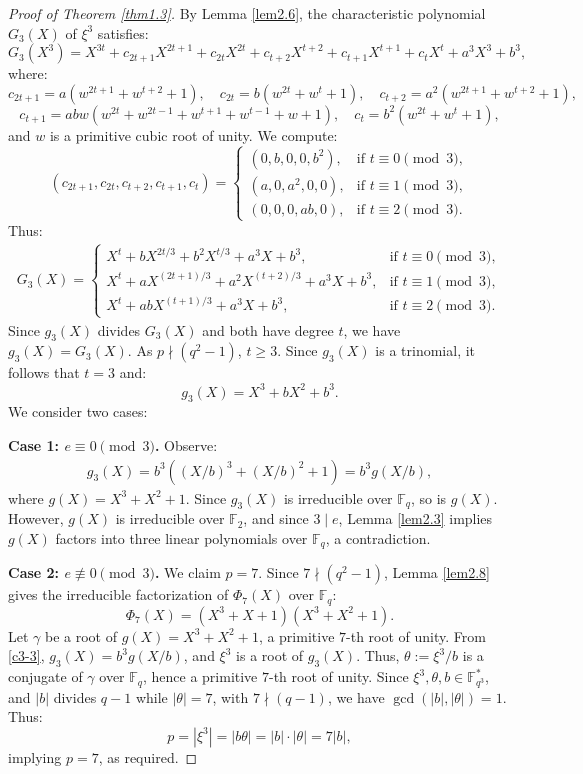 \documentclass[10pt,reqno]{amsart}
\theoremstyle{definition}
\theoremstyle{remark}
\numberwithin{equation}{section}
\begin{document}
\begin{proof}[Proof of Theorem \ref{thm1.3}]
By Lemma \ref{lem2.6}, the characteristic polynomial $G_3(X)$ of $\xi^3$ satisfies:
\[
G_3(X^3) = X^{3t} + c_{2t+1} X^{2t+1} + c_{2t} X^{2t} + c_{t+2} X^{t+2} + c_{t+1} X^{t+1} + c_t X^t + a^3 X^3 + b^3,
\]
where:
\[
c_{2t+1} = a(w^{2t+1} + w^{t+2} + 1), \quad c_{2t} = b(w^{2t} + w^t + 1), \quad c_{t+2} = a^2(w^{2t+1} + w^{t+2} + 1),
\]
\[
c_{t+1} = ab w (w^{2t} + w^{2t-1} + w^{t+1} + w^{t-1} + w + 1), \quad c_t = b^2(w^{2t} + w^t + 1),
\]
and $w$ is a primitive cubic root of unity. We compute:
\[
(c_{2t+1}, c_{2t}, c_{t+2}, c_{t+1}, c_t) = \begin{cases} 
(0, b, 0, 0, b^2), & \text{if } t \equiv 0 \pmod{3}, \\
(a, 0, a^2, 0, 0), & \text{if } t \equiv 1 \pmod{3}, \\
(0, 0, 0, ab, 0), & \text{if } t \equiv 2 \pmod{3}.
\end{cases}
\]
Thus:
\begin{align}\label{c3-2}
G_3(X) =
\begin{cases} 
X^t + b X^{2t/3} + b^2 X^{t/3} + a^3 X + b^3, & \text{if } t \equiv 0 \pmod{3}, \\
X^t + a X^{(2t+1)/3} + a^2 X^{(t+2)/3} + a^3 X + b^3, & \text{if } t \equiv 1 \pmod{3}, \\
X^t + ab X^{(t+1)/3} + a^3 X + b^3, & \text{if } t \equiv 2 \pmod{3}.
\end{cases}
\end{align}
Since $g_3(X)$ divides $G_3(X)$ and both have degree $t$, we have $g_3(X) = G_3(X)$. As $p \nmid (q^2 - 1)$, $t \geq 3$. Since $g_3(X)$ is a trinomial, it follows that $t = 3$ and:
\[
g_3(X) = X^3 + b X^2 + b^3.
\]
We consider two cases:

\textbf{Case 1: $e \equiv 0 \pmod{3}$.} Observe:
\begin{align}\label{c3-3}
g_3(X) = b^3 \left( (X/b)^3 + (X/b)^2 + 1 \right) = b^3 g(X/b),
\end{align}
where $g(X) = X^3 + X^2 + 1$. Since $g_3(X)$ is irreducible over $\mathbb{F}_q$, so is $g(X)$. However, $g(X)$ is irreducible over $\mathbb{F}_2$, and since $3 \mid e$, Lemma \ref{lem2.3} implies $g(X)$ factors into three linear polynomials over $\mathbb{F}_q$, a contradiction.

\textbf{Case 2: $e \not\equiv 0 \pmod{3}$.} We claim $p = 7$. Since $7 \nmid (q^2 - 1)$, Lemma \ref{lem2.8} gives the irreducible factorization of $\Phi_7(X)$ over $\mathbb{F}_q$:
\[
\Phi_7(X) = (X^3 + X + 1)(X^3 + X^2 + 1).
\]
Let $\gamma$ be a root of $g(X)=X^3 + X^2 + 1$, a primitive $7$-th root of unity. From \eqref{c3-3}, $g_3(X) = b^3 g(X/b)$, and $\xi^3$ is a root of $g_3(X)$. Thus, $\theta := \xi^3 / b$ is a conjugate of $\gamma$ over $\mathbb{F}_q$, hence a primitive $7$-th root of unity. Since $\xi^3, \theta, b \in \mathbb{F}_{q^3}^*$, and $|b|$ divides $q-1$ while $|\theta| = 7$, with $7 \nmid (q-1)$, we have $\gcd(|b|, |\theta|) = 1$. Thus:
\[
p = |\xi^3| = |b \theta| = |b| \cdot |\theta| = 7 |b|,
\]
implying $p = 7$, as required.


\end{proof}
\end{document}
